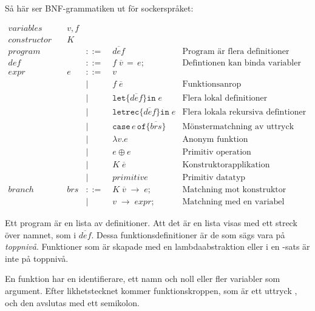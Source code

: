 \documentclass[Rapport]{subfiles}
\begin{document}
Så här ser BNF-grammatiken ut för sockerspråket:


\begin{equation*}
\begin{aligned}
variables \quad & v,f \\
constructor \quad & K \\
program \quad&&::=&\; \overline{def} 
        & \text{Program är flera definitioner}\\ 
def  \quad && ::=&\; f \; \overline{v} \, \mathtt{=} \, e \mathtt{;} 
        & \text {Defintionen kan binda variabler för ett uttryck}\\
expr \quad & e &::=&\;  v \\
       &&|&\; f \; \overline{e}  
            & \text{Funktionsanrop} \\ 
       &&|&\; \mathtt{let \{} \overline{def} \mathtt{\} in }\; e 
            & \text{Flera lokal definitioner}\\
       &&|&\; \mathtt{letrec \{} \overline{def} \mathtt{\} in} \; e 
            & \text{Flera lokala rekursiva defintioner} \\
       &&|&\; \mathtt{case} \, e \, \mathtt{of \{} \overline{brs} \mathtt{\}} 
            & \text{Mönstermatchning av uttryck} \\
       &&|&\; \mathtt{\lambda } v \mathtt{.} e
            & \text{Anonym funktion} \\
       &&|&\; e \oplus e 
            & \text{Primitiv operation}\\ 
       &&|&\; K \; \overline{e} 
            & \text{Konstruktorapplikation} \\
       &&|&\; primitive 
            & \text{Primitiv datatyp} \\
branch \quad & brs &::=&\; K \; \overline{v} \; \mathtt{\rightarrow} \; e \mathtt{;} 
            & \text{Matchning mot konstruktor} \\
         &&|&\; v \; \mathtt{\rightarrow} \; expr \mathtt{;}
            & \text{Matchning med en variabel}
\end{aligned}
\end{equation*}


Ett program är en lista av definitioner. Att det är en lista visas med ett streck över namnet, som i $\overline{def}$.
Dessa funktionsdefinitioner är de som sägs vara på \emph{toppnivå}. Funktioner som är 
skapade med en lambdaabstraktion eller i en -sats är inte på toppnivå. 

En funktion har en identifierare, ett namn och noll eller fler variabler som argument. Efter likhetstecknet
kommer funktionskroppen, som är ett uttryck , och den avslutas med
ett semikolon.
\end{document}
